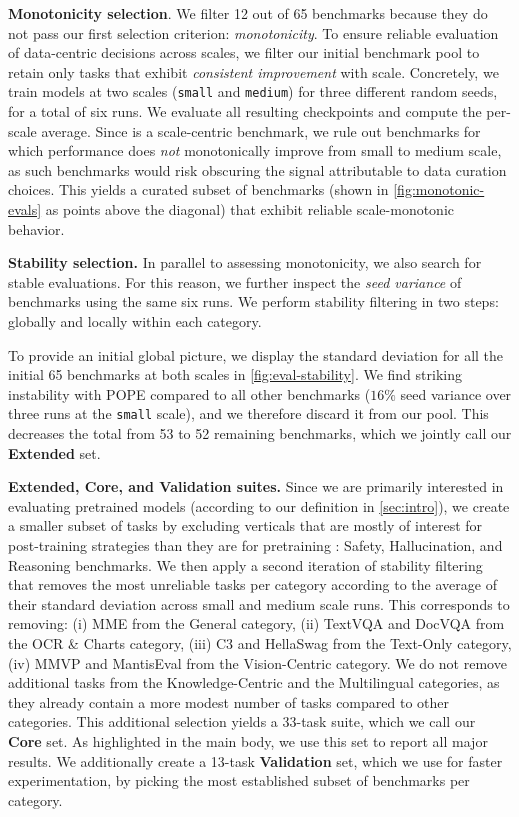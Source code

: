 \textbf{Monotonicity selection}.
We filter 12 out of 65 benchmarks because they do not pass our first selection criterion: \textit{monotonicity}. 
To ensure reliable evaluation of data-centric decisions across scales, we filter our initial benchmark pool to retain only tasks that exhibit \textit{consistent improvement} with scale. 
Concretely, we train models at two scales (\texttt{small} and \texttt{medium}) for three different random seeds, for a total of six runs. We evaluate all resulting checkpoints and compute the per-scale average.
Since \dcvlm is a scale-centric benchmark, we rule out benchmarks for which performance does \textit{not} monotonically improve from small to medium scale, as such benchmarks would risk obscuring the signal attributable to data curation choices. 
This yields a curated subset of benchmarks (shown in \cref{fig:monotonic-evals} as points above the diagonal) that exhibit reliable scale-monotonic behavior. 

\textbf{Stability selection.} In parallel to assessing monotonicity, we also search for stable evaluations. 
For this reason, we further inspect the \textit{seed variance} of benchmarks using the same six runs. 
We perform stability filtering in two steps: globally and locally within each category. 

To provide an initial global picture, we display the standard deviation for all the initial 65 benchmarks at both scales in \cref{fig:eval-stability}.
We find striking instability with POPE \cite{li2023evaluating} compared to all other benchmarks ($16\%$ seed variance over three runs at the \texttt{small} scale), and we therefore discard it from our pool. 
This decreases the total from 53 to 52 remaining benchmarks, which we jointly call our \textbf{Extended} set. 





\textbf{Extended, Core, and Validation suites.} Since we are primarily interested in evaluating pretrained models (according to our definition in \cref{sec:intro}), we create a smaller subset of tasks by excluding verticals that are mostly of interest for post-training strategies than they are for pretraining \cite{zong2024safety, guha2025openthoughts}: Safety, Hallucination, and Reasoning benchmarks. 
We then apply a second iteration of stability filtering that removes the most unreliable tasks per category according to the average of their standard deviation across small and medium scale runs. 
This corresponds to removing: (i) MME \cite{fu2023mme} from the General category, (ii) 
TextVQA and DocVQA from the OCR \& Charts category, (iii) C3 and HellaSwag from the Text-Only category, (iv) MMVP and MantisEval from the Vision-Centric category. 
We do not remove additional tasks from the Knowledge-Centric and the Multilingual categories, as they already contain a more modest number of tasks compared to other categories. 
This additional selection yields a 33-task suite, which we call our \textbf{Core} set.
As highlighted in the main body, we use this set to report all major results.
We additionally create a 13-task \textbf{Validation} set, which we use for faster experimentation, by picking the most established subset of benchmarks per category. 

